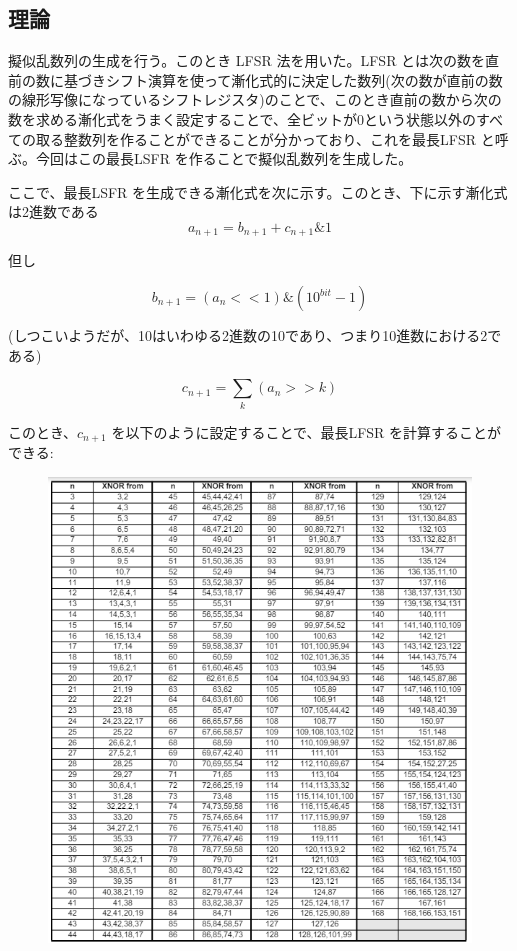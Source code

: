 \documentclass[xelatex,ja=standard]{bxjsarticle}
\begin{document}
\subsection{理論}

擬似乱数列の生成を行う。このとき LFSR 法を用いた。LFSR とは次の数を直前の数に基づきシフト演算を使って漸化式的に決定した数列(次の数が直前の数の線形写像になっているシフトレジスタ)のことで、このとき直前の数から次の数を求める漸化式をうまく設定することで、全ビットが0という状態以外のすべての取る整数列を作ることができることが分かっており、これを最長LFSR と呼ぶ。今回はこの最長LSFR を作ることで擬似乱数列を生成した。

ここで、最長LSFR を生成できる漸化式を次に示す。このとき、下に示す漸化式は2進数である
\[
a_{n+1}  = b_{n+1} + c_{n+1} \& 1
\]

但し

\[
b_{n+1} = ( a_{n} << 1 ) \& (10^{bit} - 1)
\]

(しつこいようだが、10はいわゆる2進数の10であり、つまり10進数における2である)

\[
c_{n+1} = \sum_{k} (a_n >> k)
\]

このとき、$ c_{n+1} $ を以下のように設定することで、最長LFSR を計算することができる:

\begin{figure}[htbp]
    \centering
    \includegraphics[scale=1]
{1.png}
    \label{fig:1}
\end{figure}
\end{document}
